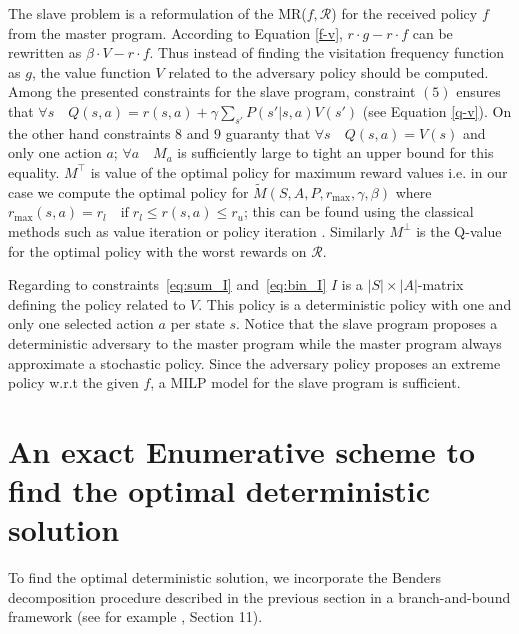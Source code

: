 \documentclass[runningheads,a4paper]{llncs}
\begin{document}
The slave problem is a reformulation of the MR($f, \mathcal{R}$) for the received policy $f$ from the master program. According to Equation \ref{f-v}, $r \cdot g - r \cdot f$ can be rewritten as $\beta \cdot V - r \cdot f$. Thus instead of finding the visitation frequency function as $g$, the value function $V$ related to the adversary policy should be computed. Among the presented constraints for the slave program, constraint $(5)$ ensures that $\forall s \quad Q(s, a) = r(s,a) + \gamma \sum_{s'} P(s'|s,a)V(s')$ (see Equation \ref{q-v}). On the other hand constraints $8$ and $9$ guaranty that $\forall s \quad Q(s, a) = V(s)$ and only one action $a$; $\forall a \quad M_a$ is sufficiently large to tight an upper bound for this equality. $M^{\top}$ is value of the optimal policy for maximum reward values i.e. in our case we compute the optimal policy for $\tilde{M}(S, A, P, r_{\text{max}}, \gamma, \beta)$ where $r_{\text{max}}(s, a) = r_l \quad \text{if} \; r_l \leq r(s, a) \leq r_u$; this can be found using the classical methods such as value iteration or policy iteration \cite{Sutton1998}. Similarly $M^{\perp}$ is the Q-value for the optimal policy with the worst rewards on $\mathcal{R}$. 

Regarding to constraints~\eqref{eq:sum_I} and~\eqref{eq:bin_I} $I$ is a $|S|\times|A|$-matrix defining the policy related to $V$. This policy is a deterministic policy with one and only one selected action $a$ per state $s$. Notice that the slave program proposes a deterministic adversary to the master program while the master program always approximate a stochastic policy. Since the adversary policy proposes an extreme policy w.r.t the given $f$, a MILP model for the slave program is sufficient.   


\section{An exact Enumerative scheme to find the optimal deterministic solution}\label{sec:bb} 

To find the optimal deterministic solution, we incorporate the Benders decomposition procedure described in the previous section in a branch-and-bound framework (see for example \cite{bertsimas2005optimization}, Section 11). 
\end{document}
